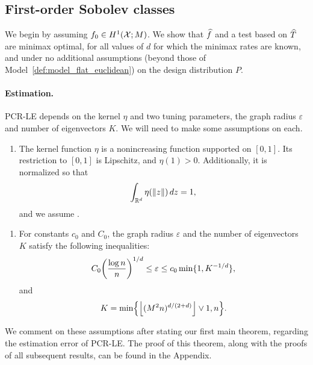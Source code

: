 \subsection{First-order Sobolev classes}
\label{sec:first_order_sobolev_classes}
We begin by assuming $f_0 \in H^1(\mathcal{X}; M)$. We show that $\widehat{f}$ and a test based on $\widehat{T}$ are minimax optimal, for all values of $d$ for which the minimax rates are known, and under no additional assumptions (beyond those of Model~\ref{def:model_flat_euclidean}) on the design distribution $P$.

\paragraph{Estimation.} PCR-LE depends on the kernel $\eta$ and two tuning parameters, the graph radius $\varepsilon$ and number of eigenvectors $K$. We will need to make some assumptions on each.
\begin{enumerate}[label=(K\arabic*)]
	\setcounter{enumi}{0}
	\item
	\label{asmp:kernel_flat_euclidean}
	The kernel function $\eta$ is a nonincreasing function supported on $[0,1]$. Its restriction to $[0,1]$ is Lipschitz, and $\eta(1) > 0$. Additionally, it is normalized so that
	\begin{equation*}
	\int_{\mathbb{R}^d} \eta(\|z\|) \,dz = 1,
	\end{equation*}
	and we assume .
\end{enumerate}
\begin{enumerate}[label=(P\arabic*)]
	\setcounter{enumi}{0}
	\item 
	\label{asmp:parameters_estimation_fo} 
	For constants $c_0$ and $C_0$, the graph radius $\varepsilon$ and the number of eigenvectors $K$ satisfy the following inequalities:
	\begin{equation}\\
	\label{eqn:radius_fo} 
	C_0\biggl(\frac{\log n}{n}\biggr)^{1/d} \leq \varepsilon \leq c_0\min\{1,K^{-1/d}\},
	\end{equation}
	and 
	\begin{equation}
	\label{eqn:eigenvector_estimation_fo} 
	K = \min\Bigl\{\left\lfloor (M^2n)^{d/(2 + d)} \right\rfloor \vee 1, n\Bigr\}.
	\end{equation}
\end{enumerate}
We comment on these assumptions after stating our first main theorem, regarding the estimation error of PCR-LE. The proof of this theorem, along with the proofs of all subsequent results, can be found in the Appendix.
